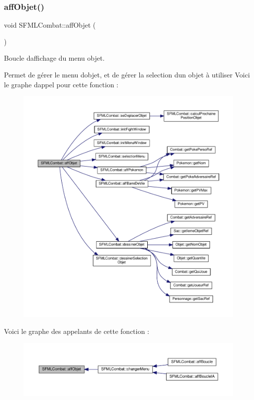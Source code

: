 \subsubsection{\texorpdfstring{aff\+Objet()}{affObjet()}}
{\footnotesize\ttfamily void S\+F\+M\+L\+Combat\+::aff\+Objet (\begin{DoxyParamCaption}{ }\end{DoxyParamCaption})\hspace{0.3cm}{\ttfamily [private]}}



Boucle d\textquotesingle{}affichage du menu objet. 

Permet de gérer le menu d\textquotesingle{}objet, et de gérer la selection d\textquotesingle{}un objet à utiliser Voici le graphe d\textquotesingle{}appel pour cette fonction \+:\nopagebreak
\begin{figure}[H]
\begin{center}
\leavevmode
\includegraphics[width=350pt]{class_s_f_m_l_combat_a55c6728be410efdf2ca919a9ee44728a_cgraph}
\end{center}
\end{figure}
Voici le graphe des appelants de cette fonction \+:\nopagebreak
\begin{figure}[H]
\begin{center}
\leavevmode
\includegraphics[width=350pt]{class_s_f_m_l_combat_a55c6728be410efdf2ca919a9ee44728a_icgraph}
\end{center}
\end{figure}
\mbox{\label{class_s_f_m_l_combat_ab5de8e3048e2549352cea43a3ff636d4}} 
